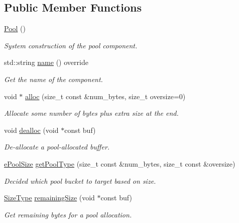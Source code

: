 \subsection*{Public Member Functions}
\begin{DoxyCompactItemize}
\item 
\hyperlink{structvt_1_1pool_1_1_pool_a55a236c42c331940884370c85fb18e36}{Pool} ()
\begin{DoxyCompactList}\small\item\em System construction of the pool component. \end{DoxyCompactList}\item 
std\+::string \hyperlink{structvt_1_1pool_1_1_pool_a02fa54fc3cca0d388f25f397dfd997ab}{name} () override
\begin{DoxyCompactList}\small\item\em Get the name of the component. \end{DoxyCompactList}\item 
void $\ast$ \hyperlink{structvt_1_1pool_1_1_pool_a0bf20e8b4ad1b85fb8952d81d433da55}{alloc} (size\+\_\+t const \&num\+\_\+bytes, size\+\_\+t oversize=0)
\begin{DoxyCompactList}\small\item\em Allocate some number of bytes plus extra size at the end. \end{DoxyCompactList}\item 
void \hyperlink{structvt_1_1pool_1_1_pool_a73ef123aa04b44ae875716e2c7b95cab}{dealloc} (void $\ast$const buf)
\begin{DoxyCompactList}\small\item\em De-\/allocate a pool-\/allocated buffer. \end{DoxyCompactList}\item 
\hyperlink{structvt_1_1pool_1_1_pool_ace8d36439e5e599a8ee68b2f1a6a6b28}{e\+Pool\+Size} \hyperlink{structvt_1_1pool_1_1_pool_a9aa5afbbea5a61265746c4d461502d62}{get\+Pool\+Type} (size\+\_\+t const \&num\+\_\+bytes, size\+\_\+t const \&oversize)
\begin{DoxyCompactList}\small\item\em Decided which pool bucket to target based on size. \end{DoxyCompactList}\item 
\hyperlink{structvt_1_1pool_1_1_pool_a4030898e09d0160c24743a7b949c0d46}{Size\+Type} \hyperlink{structvt_1_1pool_1_1_pool_a7d6742d6abc615255e25363a1be067be}{remaining\+Size} (void $\ast$const buf)
\begin{DoxyCompactList}\small\item\em Get remaining bytes for a pool allocation. \end{DoxyCompactList}\item 

\end{DoxyCompactItemize}

